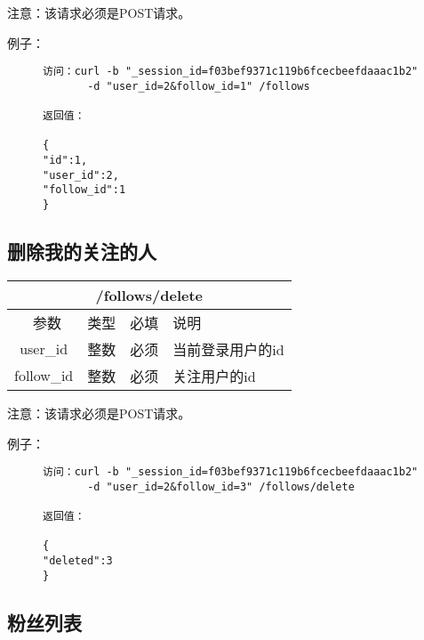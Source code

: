\documentclass[cs4size]{ctexartutf8}
\begin{document}
注意：该请求必须是POST请求。

例子：

\begin{figure}[H]
\begin{verbatim}
访问：curl -b "_session_id=f03bef9371c119b6fcecbeefdaaac1b2"
       -d "user_id=2&follow_id=1" /follows

返回值：

{
"id":1,
"user_id":2,
"follow_id":1
}

\end{verbatim}
\end{figure}



\subsection{删除我的关注的人}

\begin{table}[H]
   \begin{center}
\begin{tabular}{|c|c|c|p{12cm}|}
\hline
\multicolumn{4}{|c|}{/follows/delete} \\
\hline\hline
 \  参数  & 类型 & 必填 &  说明  \\
\hline
 user\_id  & 整数 & 必须 &  当前登录用户的id\\
\hline
 follow\_id  & 整数 & 必须 &  关注用户的id\\
\hline
\end{tabular}
   \end{center}
\end{table}

注意：该请求必须是POST请求。

例子：

\begin{figure}[H]
\begin{verbatim}
访问：curl -b "_session_id=f03bef9371c119b6fcecbeefdaaac1b2"
       -d "user_id=2&follow_id=3" /follows/delete

返回值：

{
"deleted":3
}

\end{verbatim}
\end{figure}



\subsection{粉丝列表}
\end{document}
